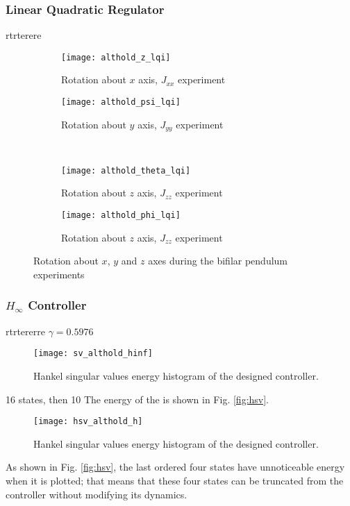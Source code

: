 \subsubsection{Linear Quadratic Regulator}
rtrterere
\begin{figure}[H]
\begin{subfigure}{.5\linewidth}
\centering
\texttt{[image: althold\_z\_lqi]}
\caption{Rotation about $x$ axis, $J_{xx}$ experiment}
\label{fig:althold_z_lqi}
\end{subfigure}%
\begin{subfigure}{.5\linewidth}
\centering
\texttt{[image: althold\_psi\_lqi]}
\caption{Rotation about $y$ axis, $J_{yy}$ experiment}
\label{fig:althold_psi_lqi}
\end{subfigure}\\[1ex]
\begin{subfigure}{0.5\linewidth}
\centering
\texttt{[image: althold\_theta\_lqi]}
\caption{Rotation about $z$ axis, $J_{zz}$ experiment}
\label{fig:althold_theta_lqi}
\end{subfigure}
\begin{subfigure}{0.5\linewidth}
\centering
\texttt{[image: althold\_phi\_lqi]}
\caption{Rotation about $z$ axis, $J_{zz}$ experiment}
\label{fig:althold_phi_lqi}
\end{subfigure}
\caption{Rotation about $x$, $y$ and $z$ axes during the bifilar pendulum experiments}
\label{fig:althold_lqi}
\end{figure}

\subsubsection{$H_\infty$ Controller}
rtrtererre
$\gamma = 0.5976$
\begin{figure}[h]
\begin{center}
\texttt{[image: sv\_althold\_hinf]}  
\caption{Hankel singular values energy histogram of the designed controller.} 
\label{fig:sv_auto_hinf}
\end{center}
\end{figure}
16 states, then 10
The energy of the  is shown in Fig. \ref{fig:hsv}.
\begin{figure}[h]
\begin{center}
\texttt{[image: hsv\_althold\_h]}  
\caption{Hankel singular values energy histogram of the designed controller.} 
\label{fig:hsv_auto_h}
\end{center}
\end{figure}
As shown in Fig. \ref{fig:hsv}, the last ordered four states have unnoticeable energy when it is plotted; that means that these four states can be truncated from the controller without modifying its dynamics.

